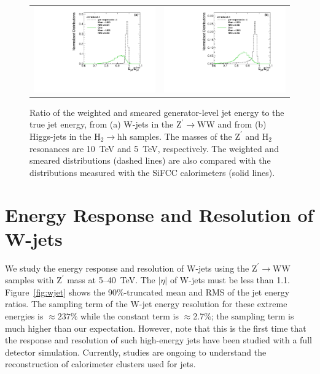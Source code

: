 \documentclass{PoS}
\begin{document}
\begin{figure}
\begin{center}
\begin{tabular}{cc}
\includegraphics[width=.4\textwidth]{figs/ZprimeWW_radius0p4_h_jeratio_gen_response.pdf} &
\includegraphics[width=.4\textwidth]{figs/2HDM_radius0p4_h_jeratio_gen_response.pdf} \\
\end{tabular}
\end{center}
\caption{Ratio of the weighted and smeared generator-level jet energy to 
 the true jet energy, from (a) W-jets in the 
$\mathrm{Z}^{\prime}\rightarrow \mathrm{WW}$ and from (b) Higgs-jets in 
the $\mathrm{H}_2\rightarrow \mathrm{hh}$ samples. The masses 
of the $\mathrm{Z}^{\prime}$ and $\mathrm{H}_2$ resonances 
are 10~TeV and 5~TeV, respectively. The weighted and smeared distributions 
(dashed lines) are also compared with the distributions measured 
with the SiFCC calorimeters (solid lines).}
\label{fig:weight}
\end{figure}


\section{Energy Response and Resolution of W-jets \label{sec:jetresponse}}
We study the energy response and resolution of W-jets using the 
$\mathrm{Z}^{\prime}\rightarrow \mathrm{WW}$ samples with $\mathrm{Z}^{\prime}$ 
mass at 5--40~TeV. The $\left|\eta\right|$ of W-jets must be less than 1.1. 
Figure~\ref{fig:wjet} shows the 90\%-truncated mean and RMS of the jet energy ratios. 
The sampling term of the W-jet energy resolution for these extreme energies 
is $\approx 237\%$ while the constant term is $\approx$2.7\%;
the sampling term is much higher than our expectation. 
However, note that this is the first time that the response and resolution of 
such high-energy jets have been studied with a full detector simulation. 
Currently, studies are ongoing to understand the reconstruction
of calorimeter clusters used for jets. 
\end{document}
